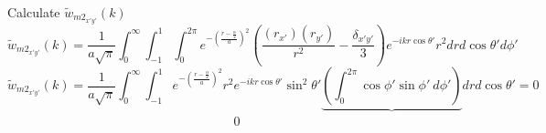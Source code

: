 \documentclass[double,12pt]{beavtex}
\begin{document}
Calculate $\widetilde{w}_{{m2}_{x'y'}}(k)$ 
\begin{equation}{\widetilde{w}_{{m2}_{x'y'}}(k)=\frac{1}{a\sqrt{\pi}}\int_{0}^{\infty}\int_{-1}^{1}\int_{0}^{2\pi}e^{-\left(\frac{r-\frac{\alpha}{2}}{a}\right)^2}\left(\frac{(r_{x'})(r_{y'})}{r^2}-\frac{\delta_{x'y'}}{3}\right)e^{-ikr\cos\theta'}r^2d{r}d{\cos\theta'}d{\phi'}}\end{equation}
\begin{equation}{\widetilde{w}_{{m2}_{x'y'}}(k)=\frac{1}{a\sqrt{\pi}}\int_{0}^{\infty}\int_{-1}^{1}e^{-\left(\frac{r-\frac{\alpha}{2}}{a}\right)^2}r^2e^{-ikr\cos\theta'}\sin^2\theta'\underbrace{\left(\int_{0}^{2\pi}\cos\phi'\sin{\phi'}~d{\phi'}\right)}d{r}d{\cos\theta'}=0}\end{equation}
$~~~~~~~~~~~~~~~~~~~~~~~~~~~~~~~~~~~~~~~~~~~~~~~~~~~~~~~~~~~~~~~~~~~~~~~~~~~~~~~~0$
\end{document}

